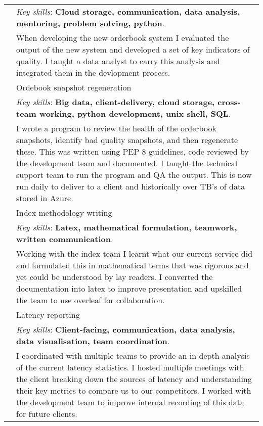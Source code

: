 \documentclass[a4paper,10pt]{article}
\newcommand{\tab}{\hspace{10 pt}}
\begin{document}
\begin{tabular}{p{2.25cm}|p{15cm}}
	 & \footnotesize{\emph{Key skills}: \textbf{Cloud storage, communication, data analysis, mentoring, problem solving, python}.}\\
	 & \footnotesize{When developing the new orderbook system I evaluated the output of the new system and developed a set of key indicators of quality. I taught a data analyst to carry this analysis and integrated them in the devlopment process.} \vspace{0.05 in}\\	
	 & \tab Ordebook snapshot regeneration\\
	 & \footnotesize{\emph{Key skills}: \textbf{Big data, client-delivery, cloud storage, cross-team working, python development, unix shell, SQL}.}\\
	 & \footnotesize{I wrote a program to review the health of the orderbook snapshots, identify bad quality snapshots, and then regenerate these. This was written using PEP 8 guidelines, code reviewed by the development team and documented. I taught the technical support team to run the program and QA the output. This is now run daily to deliver to a client and historically over TB’s of data stored in Azure.} \vspace{0.05 in}\\
	 & \tab Index methodology writing\\
	 & \footnotesize{\emph{Key skills}: \textbf{Latex, mathematical formulation, teamwork, written communication}.}\\
	 & \footnotesize{Working with the index team I learnt what our current service did and formulated this in mathematical terms that was rigorous and yet could be understood by lay readers. I converted the documentation into latex to improve presentation and upskilled the team to use overleaf for collaboration.} \vspace{0.05 in}\\	
	 & \tab Latency reporting\\
	 & \footnotesize{\emph{Key skills}: \textbf{Client-facing, communication, data analysis, data visualisation, team coordination}.}\\
	 & \footnotesize{I coordinated with multiple teams to provide an in depth analysis of the current latency statistics. I hosted multiple meetings with the client breaking down the sources of latency and understanding their key metrics to compare us to our competitors. I worked with the development team to improve internal recording of this data for future clients.} \vspace{0.05 in}\\
\end{tabular}
\end{document}
